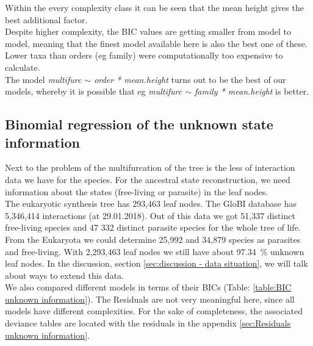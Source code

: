       Within the every complexity class it can be seen that the mean height gives the best additional factor. \\
      Despite higher complexity, the BIC values are getting smaller from model to model, meaning that 
        the finest model available here is also the best one of these. Lower taxa than orders (eg 
        family) were computationally too expensive to calculate. \\
      The model \textit{multifurc $\sim$ order * mean.height} turns out to be the best of our models, 
        whereby it is possible that eg \textit{multifurc $\sim$ family * mean.height} is better.

    \subsection{Binomial regression of the unknown state information}

      Next to the problem of the multifurcation of the tree is the less of interaction data we have for 
        the species. For the ancestral state reconstruction, we need information about the states 
        (free-living or parasite) in the leaf nodes. \\
      The eukaryotic synthesis tree has 293,463 leaf nodes. The GloBI database has 5,346,414 interactions 
        (at 29.01.2018). Out of this data we got 51,337 distinct free-living species and 47 332 
        distinct parasite species for the whole tree of life. From the Eukaryota we could determine 
        25,992 and 34,879 species as parasites and free-living. With 2,293,463 leaf nodes we still have 
        about 97.34~\% unknown leaf nodes. In the discussion, section 
        \ref{sec:discussion - data situation}, we will talk about ways to extend this data. \\
      
      We also compared different models in terms of their BICs (Table: \ref{table:BIC unknown information}). 
        The Residuals are not very meaningful here, since all models have different complexities. %
        For the sake of completeness, the associated deviance tables are located with the residuals in 
        the appendix \ref{sec:Residuals unknown information}.

